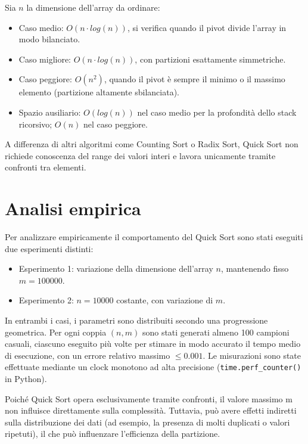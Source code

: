 \documentclass[a4paper, 12pt, oneside]{book}
\begin{document}
Sia \(n\) la dimensione dell'array da ordinare:

\begin{itemize}
    \item Caso medio: \(O(n \cdot log(n))\), si verifica quando il pivot divide l'array in modo bilanciato.
    \item Caso migliore: \(O(n \cdot log(n))\), con partizioni esattamente simmetriche.
    \item Caso peggiore: \(O(n^2)\), quando il pivot è sempre il minimo o il massimo elemento (partizione altamente sbilanciata).
    \item Spazio ausiliario: \(O(log(n))\) nel caso medio per la profondità dello stack ricorsivo; \(O(n)\) nel caso peggiore.
\end{itemize}

\noindent A differenza di altri algoritmi come Counting Sort o Radix Sort, Quick Sort non richiede conoscenza del range dei valori interi e lavora unicamente tramite confronti tra elementi.

\section{Analisi empirica}

Per analizzare empiricamente il comportamento del Quick Sort sono stati eseguiti due esperimenti distinti:

\begin{itemize}
    \item Esperimento 1: variazione della dimensione dell'array \(n\), mantenendo fisso \(m = 100000\).
    \item Esperimento 2: \(n = 10000\) costante, con variazione di \(m\).
\end{itemize}

\noindent In entrambi i casi, i parametri sono distribuiti secondo una progressione geometrica.
Per ogni coppia \((n, m)\) sono stati generati almeno 100 campioni casuali, ciascuno eseguito più volte per stimare in modo accurato il tempo medio di esecuzione, con un errore relativo massimo \(\leq 0.001\).
Le misurazioni sono state effettuate mediante un clock monotono ad alta precisione (\texttt{time.perf\_counter()} in Python).

Poiché Quick Sort opera esclusivamente tramite confronti, il valore massimo m non influisce direttamente sulla complessità. Tuttavia, può avere effetti indiretti sulla distribuzione dei dati (ad esempio, la presenza di molti duplicati o valori ripetuti), il che può influenzare l'efficienza della partizione. \\
\end{document}

